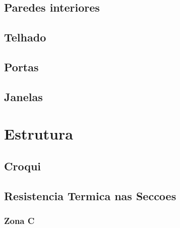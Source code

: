 \documentclass[12pt, a4paper]{article}
\begin{document}


\subsection{Paredes interiores}\label{sub:Paredes interiores}



\subsection{Telhado}\label{sub:Telhado}



\subsection{Portas}\label{sub:Portas}



\subsection{Janelas}\label{sub:Janelas}






\section{Estrutura}\label{sec:Estrutura}


\subsection{Croqui}\label{sub:Croqui}



\subsection{Resistencia Termica nas Seccoes}\label{sub:Resistencia Termica nas Seccoes}


\subsubsection{Zona C}\label{ssub:Zona C}

\end{document}
